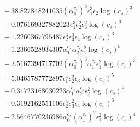 \documentclass[10pt]{article}
\begin{document}
\begin{align*}
&{}  - 38.827848241035 \left(\alpha_{0}^{c_s}\right)^{3} \epsilon_{1}^{3} \epsilon_{2} \log{\left(c_{s} \right)}^{3} \\
&{}  - 0.076169327882023 \epsilon_{1}^{3} \epsilon_{2}^{2} \epsilon_{3}^{2} \log{\left(c_{s} \right)}^{6} \\
&{}  - 1.2260367795487 \epsilon_{2}^{3} \epsilon_{3}^{3} \epsilon_{4} \log{\left(c_{s} \right)}^{3} \\
&{}  - 1.2366528934307 \alpha_{1}^{c_s} \alpha_{2}^{c_s} \epsilon_{1}^{2} \log{\left(c_{s} \right)}^{5} \\
&{}  - 2.5167394717702 \left(\alpha_{0}^{c_s}\right)^{3} \alpha_{1}^{c_s} \epsilon_{1}^{2} \log{\left(c_{s} \right)}^{3} \\
&{}  - 5.0465787772897 \epsilon_{1}^{4} \epsilon_{2}^{2} \epsilon_{3} \log{\left(c_{s} \right)}^{5} \\
&{}  - 0.31723168030223 \alpha_{1}^{c_s} \alpha_{2}^{c_s} \epsilon_{2}^{2} \log{\left(c_{s} \right)}^{4} \\
&{}  - 0.3192162551106 \epsilon_{2}^{4} \epsilon_{3}^{2} \epsilon_{4} \log{\left(c_{s} \right)}^{6} \\
&{}  - 2.5646770236986 \alpha_{0}^{c_s} \left(\alpha_{1}^{c_s}\right)^{2} \epsilon_{1}^{2} \log{\left(c_{s} \right)}^{4}
\end{align*}
\end{document}
